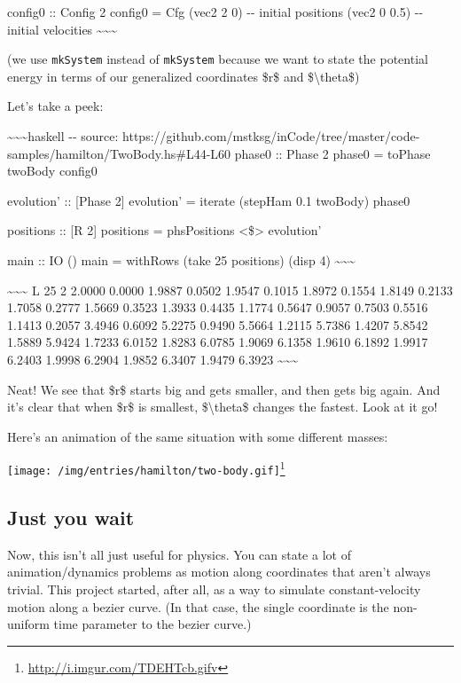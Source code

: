 \documentclass[]{article}
\renewcommand{\href}[2]{#2\footnote{\url{#1}}}
\begin{document}
config0 :: Config 2 config0 = Cfg (vec2 2 0) -\/- initial positions (vec2 0 0.5)
-\/- initial velocities \textasciitilde{}\textasciitilde{}\textasciitilde{}

(we use \texttt{mkSystem} instead of \texttt{mkSystem\textquotesingle{}} because
we want to state the potential energy in terms of our generalized coordinates
\$r\$ and \$\textbackslash{}theta\$)

Let's take a peek:

\textasciitilde{}\textasciitilde{}\textasciitilde{}haskell -\/- source:
https://github.com/mstksg/inCode/tree/master/code-samples/hamilton/TwoBody.hs\#L44-L60
phase0 :: Phase 2 phase0 = toPhase twoBody config0

evolution' :: {[}Phase 2{]} evolution' = iterate (stepHam 0.1 twoBody) phase0

positions :: {[}R 2{]} positions = phsPositions \textless{}\$\textgreater{}
evolution'

main :: IO () main = withRows (take 25 positions) (disp 4)
\textasciitilde{}\textasciitilde{}\textasciitilde{}

\textasciitilde{}\textasciitilde{}\textasciitilde{} L 25 2 2.0000 0.0000 1.9887
0.0502 1.9547 0.1015 1.8972 0.1554 1.8149 0.2133 1.7058 0.2777 1.5669 0.3523
1.3933 0.4435 1.1774 0.5647 0.9057 0.7503 0.5516 1.1413 0.2057 3.4946 0.6092
5.2275 0.9490 5.5664 1.2115 5.7386 1.4207 5.8542 1.5889 5.9424 1.7233 6.0152
1.8283 6.0785 1.9069 6.1358 1.9610 6.1892 1.9917 6.2403 1.9998 6.2904 1.9852
6.3407 1.9479 6.3923 \textasciitilde{}\textasciitilde{}\textasciitilde{}

Neat! We see that \$r\$ starts big and gets smaller, and then gets big again.
And it's clear that when \$r\$ is smallest, \$\textbackslash{}theta\$ changes
the fastest. Look at it go!

Here's an animation of the same situation with some different masses:

\href{http://i.imgur.com/TDEHTcb.gifv}{\texttt{[image: /img/entries/hamilton/two-body.gif]}}

\subsection{Just you wait}

Now, this isn't all just useful for physics. You can state a lot of
animation/dynamics problems as motion along coordinates that aren't always
trivial. This project started, after all, as a way to simulate constant-velocity
motion along a bezier curve. (In that case, the single coordinate is the
non-uniform time parameter to the bezier curve.)
\end{document}
